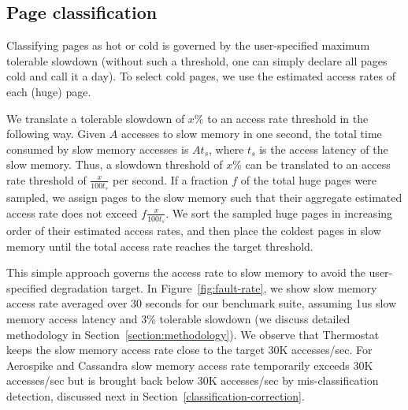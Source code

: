 \subsection{Page classification}
\label{page-classification}
Classifying pages as hot or cold is governed by the user-specified maximum
tolerable slowdown (without such a threshold, one can simply declare all
pages cold and call it a day). To select cold pages, we use the estimated access
rates of each (huge) page.

We translate a tolerable slowdown of $x\%$ to an access rate
threshold in the following way. Given $A$ accesses to slow memory in one second,
the total time consumed by slow memory accesses is $At_s$, where $t_s$ is the
access latency of the slow memory.
Thus, a slowdown threshold of $x\%$ can be translated to an access rate
threshold of $\frac{x}{100t_s}$ per second. If a fraction $f$ of the total
huge pages were sampled, we assign pages to the slow memory such that their
aggregate estimated access rate does not exceed
$f\frac{x}{100t_s}$. We sort the sampled huge pages in increasing
order of their estimated access rates, and then place the coldest pages in slow
memory until the total access rate reaches the target threshold.

This simple approach governs the access rate to slow memory to avoid the
user-specified degradation target. In Figure~\ref{fig:fault-rate}, we
show slow memory access rate averaged over 30 seconds for our benchmark suite,
assuming 1us slow memory access latency and 3\% tolerable slowdown (we discuss
detailed methodology in Section~\ref{section:methodology}). We observe that
Thermostat keeps the slow memory access rate close to the target 30K
accesses/sec. For Aerospike and Cassandra slow memory access rate
temporarily exceeds 30K accesses/sec but is brought back below 30K accesses/sec by 
mis-classification detection, discussed next in
Section~\ref{classification-correction}.

